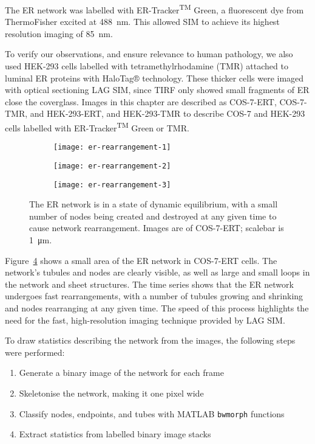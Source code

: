 The ER network was labelled with ER-Tracker\textsuperscript{TM} Green, a fluorescent dye from ThermoFisher excited at \SI{488}{\nano\meter}. 
This allowed SIM to achieve its highest resolution imaging of \SI{85}{\nano\meter}. 

To verify our observations, and ensure relevance to human pathology, we also used HEK-293 cells labelled with tetramethylrhodamine (TMR) attached to luminal ER proteins with HaloTag® technology. 
These thicker cells were imaged with optical sectioning LAG SIM, since TIRF only showed small fragments of ER close the coverglass. 
Images in this chapter are described as COS-7-ERT, COS-7-TMR, and HEK-293-ERT, and HEK-293-TMR to describe COS-7 and HEK-293 cells labelled with ER-Tracker\textsuperscript{TM} Green or TMR. 

\begin{figure}[htbp!]
\centering
\begin{subfigure}[b]{0.325\textwidth}
	\texttt{[image: er-rearrangement-1]}
	\caption{}\label{fig:er-rearrangement-1}
\end{subfigure}\hfill
\begin{subfigure}[b]{0.325\textwidth}
	\texttt{[image: er-rearrangement-2]}
	\caption{}\label{fig:er-rearrangement-2}
\end{subfigure}\hfill
\begin{subfigure}[b]{0.325\textwidth}
	\texttt{[image: er-rearrangement-3]}
	\caption{}\label{fig:er-rearrangement-3}
\end{subfigure}
\caption[ER: Growing and shrinking tubules show the ER network is a state of dynamic equilibrium]{The ER network is in a state of dynamic equilibrium, with a small number of nodes being created and destroyed at any given time to cause network rearrangement. Images are of COS-7-ERT; scalebar is \SI{1}{\micro\metre}. } 
\label{fig:ER-rearrangement}
\end{figure}

Figure~\ref{fig:ER-rearrangement} shows a small area of the ER network in COS-7-ERT cells. 
The network's tubules and nodes are clearly visible, as well as large and small loops in the network and sheet structures. 
The time series shows that the ER network undergoes fast rearrangements, with a number of tubules growing and shrinking and nodes rearranging at any given time. 
The speed of this process highlights the need for the fast, high-resolution imaging technique provided by LAG SIM. 

To draw statistics describing the network from the images, the following steps were performed:
\begin{enumerate}
	\item Generate a binary image of the network for each frame
	\item Skeletonise the network, making it one pixel wide
	\item Classify nodes, endpoints, and tubes with MATLAB \texttt{bwmorph} functions
	\item Extract statistics from labelled binary image stacks
\end{enumerate}

